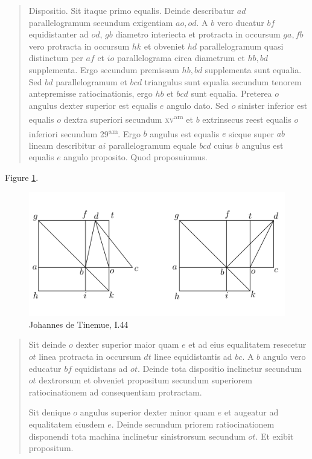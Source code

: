 \documentclass{article}
\begin{document}
\begin{quote}
Dispositio. Sit itaque primo equalis. Deinde describatur $ad$ parallelogramum
secundum exigentiam $ao, od$. A $b$ vero ducatur $bf$ equidistanter
ad $od$, $gb$ diametro interiecta et protracta in occursum $ga,fb$ vero
protracta in occursum $hk$ et obveniet $hd$ parallelogramum quasi distinctum
per $af$ et $io$ parallelograma circa diametrum et $hb,bd$ supplementa.
Ergo secundum premissam $hb,bd$ supplementa sunt equalia. Sed $bd$ parallelogramum
et $bcd$ triangulus sunt equalia secundum tenorem antepremisse
ratiocinationis, ergo $hb$ et $bcd$ sunt equalia. Preterea $o$ angulus dexter
superior est equalis $e$ angulo dato. Sed $o$ sinister inferior est equalis $o$ dextra
superiori secundum \textsc{xv}\textsuperscript{am} et $b$ extrinsecus reest equalis $o$
inferiori secundum
29\textsuperscript{am}. Ergo $b$ angulus est equalis $e$ sicque super $ab$ lineam describitur $ai$
parallelogramum equale $bcd$ cuius $b$ angulus est equalis $e$ angulo proposito.
Quod proposuiumus.
\end{quote}

Figure \ref{tinemueI44b}.

\begin{figure}
\begin{center}
\includegraphics{tinemueI44b.png}
\end{center}
\caption{Johannes de Tinemue, I.44}
\label{tinemueI44b}
\end{figure}

\begin{quote}
Sit deinde $o$ dexter superior maior quam $e$ et ad eius equalitatem 
resecetur $ot$ linea protracta in occursum $dt$ linee equidistantis ad $bc$. A 
$b$ angulo vero educatur $bf$ equidistans ad $ot$. Deinde tota dispositio inclinetur
secundum $ot$ dextrorsum et obveniet propositum secundum superiorem
ratiocinationem ad consequentiam protractam.

Sit denique $o$ angulus superior dexter minor quam $e$ et augeatur ad equalitatem
eiusdem $e$. Deinde secundum priorem ratiocinationem disponendi
tota machina inclinetur sinistrorsum secundum $ot$. Et exibit propositum.
\end{quote}
\end{document}
